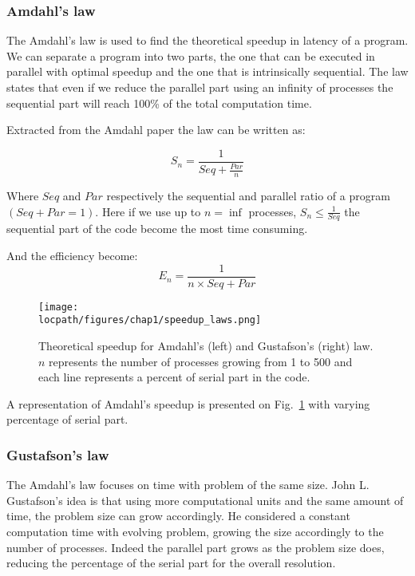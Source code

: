 \subsubsection{Amdahl's law}
The Amdahl's law\cite{amdahl1967validity} is used to find the theoretical speedup in latency of a program.
We can separate a program into two parts, the one that can be executed in parallel with optimal speedup and the one that is intrinsically sequential.
The law states that even if we reduce the parallel part using an infinity of processes the sequential part will reach 100\% of the total computation time. 

Extracted from the Amdahl paper the law can be written as: 

\begin{equation}
S_n = \frac{1}{Seq + \frac{Par}{n}}
\end{equation}

Where $Seq$ and $Par$ respectively the sequential and parallel ratio of a program $( Seq + Par = 1 )$.
Here if we use up to $n=\inf$ processes, $S_n \leq \frac{1}{Seq}$ the sequential part of the code become the most time consuming. 

And the efficiency become:
\begin{equation}
E_n = \frac{1}{n\times Seq + Par}
\end{equation}

\begin{figure}
\texttt{[image: \\locpath/figures/chap1/speedup\_laws.png]}
\caption{Theoretical speedup for Amdahl's (left) and Gustafson's (right) law. $n$ represents the number of processes growing from 1 to 500 and each line represents a percent of serial part in the code.}
\label{fig:1_HPC:speedup_laws}
\end{figure}

A representation of Amdahl's speedup is presented on Fig.~\ref{fig:1_HPC:speedup_laws} with varying percentage of serial part. 

\subsubsection{Gustafson's law}
The Amdahl's law focuses on time with problem of the same size. 
John L. Gustafson's idea \cite{gustafson1988reevaluating} is that using more computational units and the same amount of time, the problem size can grow accordingly. 
He considered a constant computation time with evolving problem, growing the size accordingly to the number of processes. 
Indeed the parallel part grows as the problem size does, reducing the percentage of the serial part for the overall resolution.

